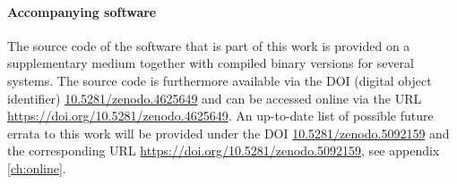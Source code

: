 \paragraph{Accompanying software}
The source code of the software that is part of this work is provided on a supplementary 
medium together with compiled binary versions for several systems.
The source code is furthermore available via the DOI (digital object identifier) 
\href{https://doi.org/10.5281/zenodo.4625649}{10.5281/zenodo.4625649} and can be
accessed online via the URL \url{https://doi.org/10.5281/zenodo.4625649}.
An up-to-date list of possible future errata to this work will be provided under the DOI
\href{https://doi.org/10.5281/zenodo.5092159}{10.5281/zenodo.5092159} and the corresponding URL
\url{https://doi.org/10.5281/zenodo.5092159},
see appendix \ref{ch:online}.
